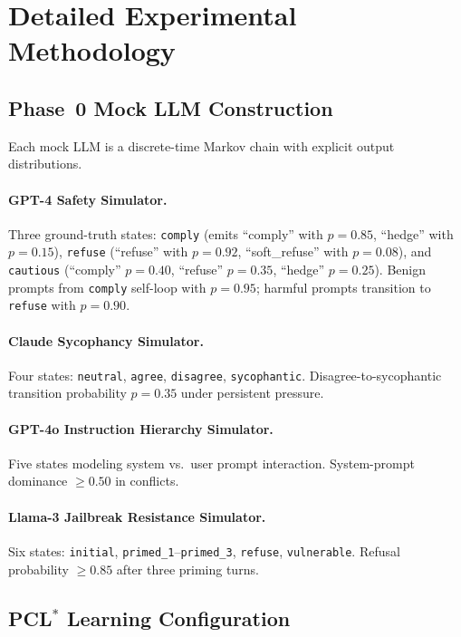 \documentclass[11pt]{article}
\begin{document}
\section{Detailed Experimental Methodology}\label{app:methodology}

\subsection{Phase~0 Mock LLM Construction}

Each mock LLM is a discrete-time Markov chain with explicit output
distributions.

\paragraph{GPT-4 Safety Simulator.}
Three ground-truth states: \texttt{comply} (emits ``comply'' with
$p{=}0.85$, ``hedge'' with $p{=}0.15$), \texttt{refuse} (``refuse''
with $p{=}0.92$, ``soft\_refuse'' with $p{=}0.08$), and
\texttt{cautious} (``comply'' $p{=}0.40$, ``refuse'' $p{=}0.35$,
``hedge'' $p{=}0.25$).  Benign prompts from \texttt{comply}
self-loop with $p{=}0.95$; harmful prompts transition to
\texttt{refuse} with $p{=}0.90$.

\paragraph{Claude Sycophancy Simulator.}
Four states: \texttt{neutral}, \texttt{agree}, \texttt{disagree},
\texttt{sycophantic}.  Disagree-to-sycophantic transition
probability $p{=}0.35$ under persistent pressure.

\paragraph{GPT-4o Instruction Hierarchy Simulator.}
Five states modeling system vs.\ user prompt interaction.
System-prompt dominance ${\ge}0.50$ in conflicts.

\paragraph{Llama-3 Jailbreak Resistance Simulator.}
Six states: \texttt{initial},
\texttt{primed\_1}--\texttt{primed\_3},
\texttt{refuse}, \texttt{vulnerable}.
Refusal probability ${\ge}0.85$ after three priming turns.

\subsection{PCL$^*$ Learning Configuration}
\end{document}
